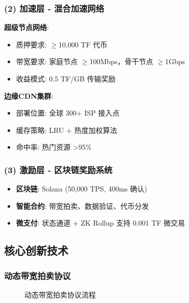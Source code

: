 \documentclass[12pt,a4paper]{article}
\begin{document}
\subsubsection{(2) 加速层 - 混合加速网络}
\textbf{超级节点网络}:
\begin{itemize}
    \item 质押要求: $\geq$10,000 TF 代币
    \item 带宽要求: 家庭节点 $\geq$100Mbps，骨干节点 $\geq$1Gbps
    \item 收益模式: 0.5 TF/GB 传输奖励
\end{itemize}

\textbf{边缘CDN集群}:
\begin{itemize}
    \item 部署位置: 全球 300+ ISP 接入点
    \item 缓存策略: LRU + 热度加权算法
    \item 命中率: 热门资源 >95\%
\end{itemize}

\subsubsection{(3) 激励层 - 区块链奖励系统}
\begin{itemize}
    \item \textbf{区块链}: Solana (50,000 TPS, 400ms 确认)
    \item \textbf{智能合约}: 带宽拍卖、数据验证、代币分发
    \item \textbf{微支付}: 状态通道 + ZK Rollup 支持 0.001 TF 微交易
\end{itemize}

\subsection{核心创新技术}

\subsubsection{动态带宽拍卖协议}

\begin{figure}[h]
\centering
{}
\caption{动态带宽拍卖协议流程}
\end{figure}
\end{document}
